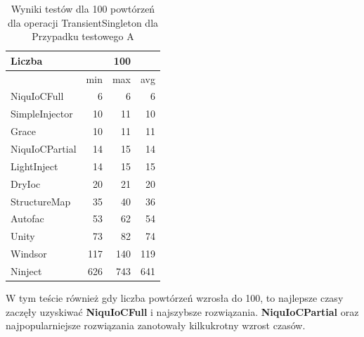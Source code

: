 \documentclass[12pt]{article}
\begin{document}
\begin{table}[H]
\captionsetup{belowskip=0pt,aboveskip=0pt}
\begin{center}
\begin{small}
	\begin{tabular}{ | l | r r r | }
    		\hline
Liczba & & 100 & \\ \hline
 & min & max & avg \\ \hline
NiquIoCFull & 6 & 6 & 6 \\ \hline
SimpleInjector & 10 & 11 & 10 \\ \hline
Grace & 10 & 11 & 11 \\ \hline
NiquIoCPartial & 14 & 15 & 14 \\ \hline
LightInject & 14 & 15 & 15 \\ \hline
DryIoc & 20 & 21 & 20 \\ \hline
StructureMap & 35 & 40 & 36 \\ \hline
Autofac & 53 & 62 & 54 \\ \hline
Unity & 73 & 82 & 74 \\ \hline
Windsor & 117 & 140 & 119 \\ \hline
Ninject & 626 & 743 & 641 \\ \hline
  	\end{tabular}
\end{small}
\end{center}
\caption{Wyniki testów dla 100 powtórzeń dla operacji TransientSingleton dla Przypadku testowego A}
\label{TestCaseA_TransientSingleton100}
\end{table}
W tym teście również gdy liczba powtórzeń wzrosła do 100, to najlepsze czasy zaczęły uzyskiwać \textbf{NiquIoCFull} i najszybsze rozwiązania. \textbf{NiquIoCPartial} oraz najpopularniejsze rozwiązania zanotowały kilkukrotny wzrost czasów.
\\ \\
\end{document}
